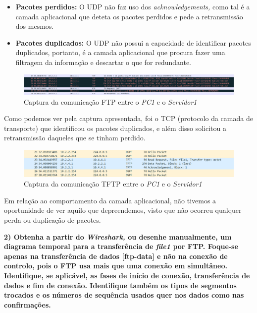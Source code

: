         \begin{itemize}
            \item \textbf{Pacotes perdidos:} O UDP não faz uso dos \textit{acknowledgements,} como tal é a camada aplicacional que deteta os pacotes perdidos e pede a retransmissão dos mesmos.
            \item \textbf{Pacotes duplicados:} O UDP não possui a capacidade de identificar pacotes duplicados, portanto, é a camada aplicacional que procura fazer uma filtragem da informação e descartar o que for redundante.
        \end{itemize}

        \begin{figure}[hb!]
            \centering
            \includegraphics[width=\textwidth]{Imagens/1.png}
            \caption{Captura da comunicação FTP entre o \textit{PC1} e o \textit{Servidor1}}
            \vspace{-10pt}
        \end{figure}

        Como podemos ver pela captura apresentada, foi o TCP (protocolo da camada de transporte) que identificou os pacotes duplicados, e além disso solicitou a retransmissão daqueles que se tinham perdido.

        \begin{figure}[hb!]
            \centering
            \includegraphics[width=\textwidth]{Imagens/2.png}
            \caption{Captura da comunicação TFTP entre o \textit{PC1} e o \textit{Servidor1}}
            \vspace{-10pt}
        \end{figure}

        Em relação ao comportamento da camada aplicacional, não tivemos a oportunidade de ver aquilo que depreendemos, visto que não ocorreu qualquer perda ou duplicação de pacotes.

        \textbf{2) Obtenha a partir do \textit{Wireshark,} ou desenhe manualmente, um diagrama temporal para a transferência de \textit{file1} por FTP. Foque-se apenas na transferência de dados [ftp-data] e não na conexão de controlo, pois o FTP usa mais que uma conexão em simultâneo. Identifique, se aplicável, as fases de início de conexão, transferência de dados e fim de conexão. Identifique também os tipos de segmentos trocados e os números de sequência usados quer nos dados como nas confirmações.}

